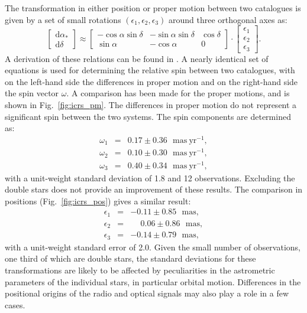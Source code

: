 \documentclass{aa}
\begin{document}
The transformation in either position or proper motion between two catalogues 
is given by a set of small rotations $(\epsilon_1,\epsilon_2,\epsilon_3)$ 
around three orthogonal axes as:
\begin{equation}
\left[\begin{array}{l}\mathrm{d}\alpha_* \\ \mathrm{d}\delta\end{array}\right]
\approx \left[\begin{array}{rrr}-\cos\alpha\sin\delta & -\sin\alpha\sin\delta &
\cos\delta \\ \sin\alpha & -\cos\alpha & 0 \end{array}\right] \cdot
\left[\begin{array}{l}\epsilon_1 \\ \epsilon_2 \\ \epsilon_3 \end{array}\right].
\label{equ:pos_trans}
\end{equation}
A derivation of these relations can be found in \citet{fvl07}. A nearly
identical set of equations is used for determining the relative spin 
between two catalogues, with on the left-hand side the differences in proper 
motion and on the right-hand side the spin vector \textbf{$\omega$}.
A comparison has been made for the proper motions, and is shown in 
Fig.~\ref{fig:icrs_pm}. The differences in proper motion do not 
represent a significant spin between the two systems. The spin components
are determined as:
\begin{eqnarray}
\omega_1 &=& 0.17\pm0.36~~~\mathrm{mas~yr^{-1}},\nonumber \\
\omega_2 &=& 0.10\pm0.30~~~\mathrm{mas~yr^{-1}},\nonumber \\
\omega_3 &=& 0.40\pm0.34~~~\mathrm{mas~yr^{-1}}, 
\end{eqnarray}
with a unit-weight standard deviation of 1.8 and 12 observations. Excluding
the double stars does not provide an improvement of these results. The
comparison in positions (Fig.~\ref{fig:icrs_pos}) gives a similar result:
\begin{eqnarray}
\epsilon_1 &=& -0.11\pm0.85~~~\mathrm{mas},\nonumber \\
\epsilon_2 &=& \phantom{-}0.06\pm0.86~~~\mathrm{mas},\nonumber \\
\epsilon_3 &=& -0.14\pm0.79~~~\mathrm{mas}, 
\end{eqnarray}
with a unit-weight standard error of 2.0. Given the small number of 
observations, one third of which are double stars, the standard deviations
for these transformations are likely to be affected by peculiarities in the
astrometric parameters of the individual stars, in particular orbital motion.
Differences in the positional origins of the radio and optical signals may also
play a role in a few cases.
\end{document}

